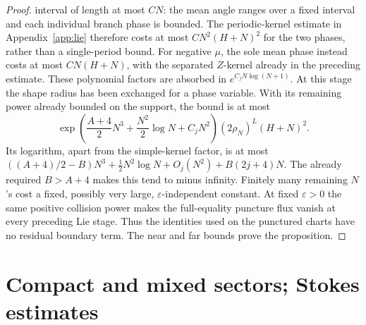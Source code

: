 \documentclass[11pt]{article}
\numberwithin{equation}{section}
\theoremstyle{definition}
\newcommand{\eps}{\varepsilon}
\begin{document}
\begin{proof}
interval of length at most \(CN\): the mean angle ranges over a
fixed interval and each individual branch phase is bounded.
The periodic-kernel estimate in Appendix~\ref{app:lie} therefore
costs at most \(CN^2(H+N)^2\) for the two phases, rather than a
single-period bound. For negative \(\mu\), the sole mean phase
instead costs at most \(CN(H+N)\), with the separated \(Z\)-kernel
already in the preceding estimate. These polynomial factors are
absorbed in \(e^{C_jN\log(N+1)}\). At this stage the shape radius has been exchanged for a phase
variable. With its remaining power already bounded on the support,
the bound is at most
\[
 \exp\left(\frac{A+4}{2}N^3+\frac{N^2}{2}\log N+C_jN^2\right)
 (2\rho_N)^L(H+N)^2.
\]
Its logarithm, apart from the simple-kernel factor, is at most
\(((A+4)/2-B)N^3+\tfrac12N^2\log N+O_j(N^2)+B(2j+4)N\).
The already required \(B>A+4\) makes this tend to minus infinity.
Finitely many remaining \(N\)'s cost a fixed, possibly very large,
\(\eps\)-independent constant.
At fixed \(\eps>0\) the same positive collision power makes the
full-equality puncture flux vanish at every preceding Lie stage.
Thus the identities used on the punctured charts have no residual
boundary term. The near and far bounds prove the proposition.
\end{proof}



\section{Compact and mixed sectors; Stokes estimates}
\label{sec:sectors}
\end{document}
